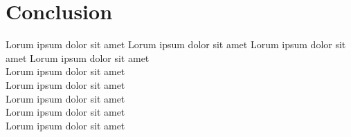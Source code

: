 \documentclass[11pt,a4paper]{article}
\begin{document}
 
 
 

\section{Conclusion}
 Lorum ipsum dolor sit amet
  Lorum ipsum dolor sit amet
   Lorum ipsum dolor sit amet
    Lorum ipsum dolor sit amet\\
     Lorum ipsum dolor sit amet\\
      Lorum ipsum dolor sit amet\\
       Lorum ipsum dolor sit amet\\
        Lorum ipsum dolor sit amet\\
         Lorum ipsum dolor sit amet


\end{document}
